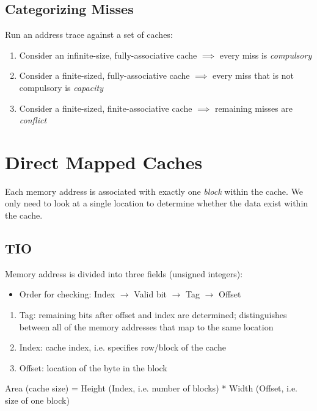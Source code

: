 \subsection{Categorizing Misses}
Run an address trace against a set of caches:
\begin{enumerate}
    \item Consider an infinite-size, fully-associative cache $\implies$ every miss is \emph{compulsory}
    \item Consider a finite-sized, fully-associative cache $\implies$ every miss that is not compulsory is \emph{capacity}
    \item Consider a finite-sized, finite-associative cache $\implies$ remaining misses are \emph{conflict}
\end{enumerate}

\section{Direct Mapped Caches}
Each memory address is associated with exactly one \emph{block} within the cache. We only need to look at a single location to determine whether the data exist within the cache.

\subsection{TIO}
Memory address is divided into three fields (unsigned integers):
\begin{itemize}
    \item Order for checking: Index $\rightarrow$ Valid bit $\rightarrow$ Tag $\rightarrow$ Offset
\end{itemize}
\begin{enumerate}
    \item Tag: remaining bits after offset and index are determined; distinguishes between all of the memory addresses that map to the same location
    \item Index: cache index, i.e. specifies row/block of the cache
    \item Offset: location of the byte in the block
\end{enumerate}

Area (cache size) = Height (Index, i.e. number of blocks) * Width (Offset, i.e. size of one block)

